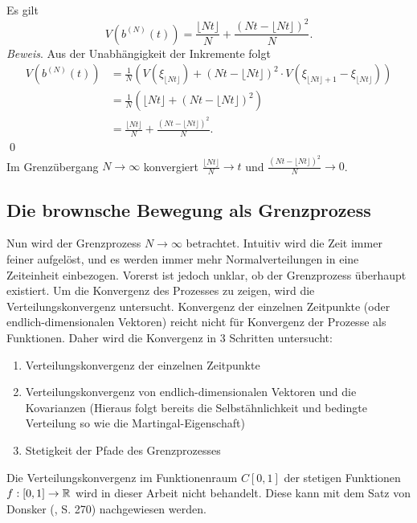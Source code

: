 \begin{lemma}
Es gilt
$$
V(b^{(N)}(t)) = \frac{\lfloor Nt \rfloor}{N} + \frac{(Nt - \lfloor Nt \rfloor)^2}{N}.
$$
\textit{Beweis}. Aus der Unabhängigkeit der Inkremente folgt
$$
\begin{aligned}
V(b^{(N)}(t)) &= \frac{1}{N} \left ( V(\xi_{\lfloor Nt \rfloor}) + (Nt - \lfloor Nt \rfloor)^2 \cdot V(\xi_{\lfloor Nt \rfloor + 1} - \xi_{\lfloor Nt \rfloor}) \right ) 
\\ &= \frac{1}{N} (\lfloor Nt \rfloor + (Nt - \lfloor Nt \rfloor)^2)  
\\ &= \frac{\lfloor Nt \rfloor}{N} + \frac{(Nt - \lfloor Nt \rfloor)^2}{N}.
\end{aligned}
$$
\qed
\\
Im Grenzübergang $N \to \infty$ konvergiert $\frac{\lfloor Nt \rfloor}{N} \to t$ und $\frac{(Nt - \lfloor Nt \rfloor)^2}{N} \to 0$.
\end{lemma}

\subsection{Die brownsche Bewegung als Grenzprozess}
Nun wird der Grenzprozess $N \to \infty$ betrachtet. Intuitiv wird die Zeit immer feiner aufgelöst,
und es werden immer mehr Normalverteilungen in eine Zeiteinheit einbezogen. Vorerst ist jedoch unklar, 
ob der Grenzprozess überhaupt existiert. Um die Konvergenz des Prozesses zu zeigen, wird die Verteilungskonvergenz 
untersucht. Konvergenz der einzelnen Zeitpunkte (oder endlich-dimensionalen Vektoren) reicht nicht 
für Konvergenz der Prozesse als Funktionen. Daher wird die Konvergenz in 3 Schritten untersucht:
\begin{enumerate}
  \item Verteilungskonvergenz der einzelnen Zeitpunkte
  \item Verteilungskonvergenz von endlich-dimensionalen Vektoren und die Kovarianzen (Hieraus folgt bereits die Selbstähnlichkeit und bedingte Verteilung so wie die Martingal-Eigenschaft)
  \item Stetigkeit der Pfade des Grenzprozesses
\end{enumerate}
Die Verteilungskonvergenz im Funktionenraum $C[0, 1]$ der stetigen Funktionen $f : [0, 1] \to \Bbb R$ wird in dieser Arbeit nicht behandelt.
Diese kann mit dem Satz von Donsker (\cite{henze2022asymptotische}, S. 270) nachgewiesen werden.

